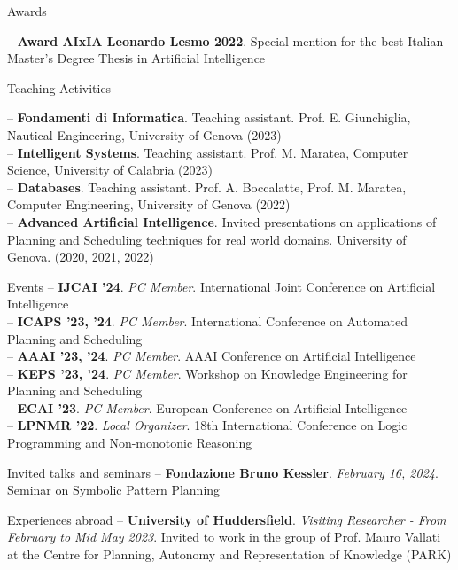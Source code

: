 \documentclass{resume} %
\begin{document}
\begin{rSection}{Awards}

-- \textbf{Award AIxIA Leonardo Lesmo 2022}. Special mention for the best Italian Master's Degree Thesis in Artificial Intelligence
\end{rSection}


\begin{rSection}{Teaching Activities}

-- \textbf{Fondamenti di Informatica}. Teaching assistant. Prof. E. Giunchiglia, Nautical Engineering, University of Genova (2023)\\
-- \textbf{Intelligent Systems}. Teaching assistant. Prof. M. Maratea, Computer Science, University of Calabria (2023)\\
-- \textbf{Databases}. Teaching assistant. Prof. A. Boccalatte, Prof. M. Maratea, Computer Engineering, University of Genova (2022)\\
-- \textbf{Advanced Artificial Intelligence}. Invited presentations on applications of Planning and Scheduling techniques for real world domains. University of Genova. (2020, 2021, 2022)
\end{rSection}


\begin{rSection}{Events}
-- \textbf{IJCAI '24}. \textit{PC Member}. International Joint Conference on Artificial Intelligence \\
-- \textbf{ICAPS '23, '24}. \textit{PC Member}. International Conference on Automated Planning and Scheduling \\
-- \textbf{AAAI '23, '24}. \textit{PC Member}. AAAI Conference on Artificial Intelligence \\
-- \textbf{KEPS '23, '24}. \textit{PC Member}. Workshop on Knowledge Engineering for Planning and Scheduling \\
-- \textbf{ECAI '23}. \textit{PC Member}. European Conference on Artificial Intelligence \\
-- \textbf{LPNMR '22}. \textit{Local Organizer}. 18th International Conference on Logic Programming and Non-monotonic Reasoning  
\end{rSection}

\begin{rSection}{Invited talks and seminars}
-- \textbf{Fondazione Bruno Kessler}. \textit{February 16, 2024}. Seminar on Symbolic Pattern Planning\end{rSection}

\begin{rSection}{Experiences abroad}
-- \textbf{University of Huddersfield}. \textit{Visiting Researcher - From February to Mid May 2023}. Invited to work in the group of Prof. Mauro Vallati at the Centre for Planning, Autonomy and Representation of Knowledge (PARK)  
\end{rSection}
\end{document}
